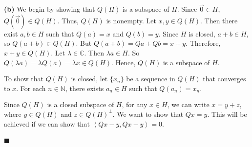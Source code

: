 \documentclass[12pt]{article}
\begin{document}
\vspace{5mm}

\noindent\textbf{(b)} We begin by showing that $Q(H)$ is a subspace of $H$. Since $\vec{0}\in H$, $Q\left(\vec{0}\right)\in Q(H).$ Thus, $Q(H)$ is nonempty. Let $x,y\in Q(H)$. Then there exist $a,b\in H$ such that $Q(a) = x$ and $Q(b) = y.$ Since $H$ is closed, $a+b\in H$, so $Q(a+b) \in Q(H)$. But $Q(a+b) = Qa + Qb = x + y.$ Therefore, $x+y\in Q(H)$. Let $\lambda\in \mathbb{C}$. Then $\lambda a \in H$. So $Q(\lambda a) = \lambda Q(a) = \lambda x \in Q(H).$ Hence, $Q(H)$ is a subspace of $H$. 

To show that $Q(H)$ is closed, let $\lbrace x_n \rbrace$ be a sequence in $Q(H)$ that converges to $x$. For each $n\in \mathbb{N}$, there exists $a_n\in H$ such that $Q(a_n) = x_n$.  

Since $Q(H)$ is a closed subspace of $H$, for any $x\in H$, we can write $x = y + z$, where $y\in Q(H)$ and $z\in Q(H)^{\perp}.$ We want to show that $Qx = y$. This will be achieved if we can show that $\left<Qx - y, Qx-y\right> = 0$.   

\hfill$\blacksquare$

\vfill

\begin{center}
\\
\vspace{2mm}
\vspace{-0.65cm}
\hrulefill \\
\vspace{-0.95cm}
\hrulefill
\end{center}
\end{document}
